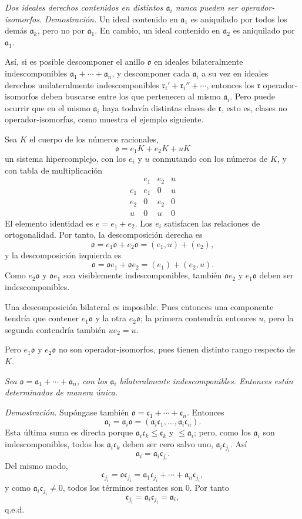 \documentclass[11pt]{article}
\providecommand{\mo}{\mathfrak{o}}
\providecommand{\ma}{\mathfrak{a}}
\providecommand{\mc}{\mathfrak{c}}
\providecommand{\mr}{\mathfrak{r}}
\begin{document}
\emph{Dos ideales derechos contenidos en distintos $\ma_i$ nunca pueden ser operador-isomorfos.}
\emph{Demostración.} Un ideal contenido en $\ma_1$ es aniquilado por todos los demás $\ma_k$, pero no por $\ma_1$. En cambio, un ideal contenido en $\ma_2$ es aniquilado por $\ma_1$.

Así, si es posible descomponer el anillo $\mo$ en ideales bilateralmente indescomponibles $\ma_1+\cdots+\ma_n$, y descomponer cada $\ma_i$ a su vez en ideales derechos unilateralmente indescomponibles $\mr_i'+\mr_i''+\cdots$, entonces los $\mr$ operador-isomorfos deben buscarse entre los que pertenecen al mismo $\ma_i$. Pero puede ocurrir que en el mismo $\ma_i$ haya todavía distintas clases de $\mr$, esto es, clases no operador-isomorfas, como muestra el ejemplo siguiente.

Sea $K$ el cuerpo de los números racionales,
\[
        \mo=e_1K+e_2K+uK
\]
un sistema hipercomplejo, con los $e_i$ y $u$ conmutando con los números de $K$, y con tabla de multiplicación
\[
\begin{array}{c|ccc}
     & e_1&e_2&u\\ \hline
 e_1 & e_1&0&u\\
 e_2 & 0&e_2&0\\
 u   & 0&u&0
\end{array}
\]
El elemento identidad es $e=e_1+e_2$. Los $e_i$ satisfacen las relaciones de ortogonalidad. Por tanto, la descomposición derecha es
\[
        \mo=e_1\mo+e_2\mo=(e_1,u)+(e_2),
\]
y la descomposición izquierda es
\[
        \mo=\mo e_1+\mo e_2=(e_1)+(e_2,u).
\]
Como $e_2\mo$ y $\mo e_1$ son visiblemente indescomponibles, también $\mo e_2$ y $e_1\mo$ deben ser indescomponibles.

Una descomposición bilateral es imposible. Pues entonces una componente tendría que contener $e_1\mo$ y la otra $e_2\mo$; la primera contendría entonces $u$, pero la segunda contendría también $ue_2=u$.

Pero $e_1\mo$ y $e_2\mo$ no son operador-isomorfos, pues tienen distinto rango respecto de $K$.

\emph{Sea $\mo=\ma_1+\cdots+\ma_n$, con los $\ma_i$ bilateralmente indescomponibles. Entonces están determinados de manera única.}

\emph{Demostración.} Supóngase también $\mo=\mc_1+\cdots+\mc_n$. Entonces
\[
        \ma_i=\ma_i\mo=(\ma_i\mc_1,\ldots,\ma_i\mc_n).
\]
Esta última suma es directa porque $\ma_i\mc_k\leq\mc_k$ y $\leq\ma_i$; pero, como los $\ma_i$ son indescomponibles, todos los $\ma_i\mc_k$ deben ser cero salvo uno, $\ma_i\mc_{j_i}$. Así
\[
        \ma_i=\ma_i\mc_{j_i}.
\]
Del mismo modo,
\[
        \mc_{j_i}=\mo\mc_{j_i}=\ma_1\mc_{j_i}+\cdots+\ma_n\mc_{j_i},
\]
y como $\ma_i\mc_{j_i}\ne0$, todos los términos restantes son $0$. Por tanto
\[
        \mc_{j_i}=\ma_i\mc_{j_i}=\ma_i,
\]
q.e.d.
\end{document}
